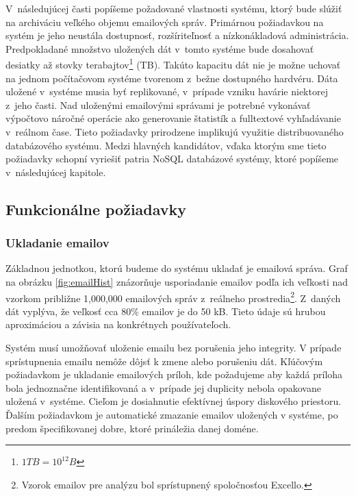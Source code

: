 \documentclass[11pt,twoside,a4paper]{book}
\begin{document}
V~následujúcej časti popíšeme požadované vlastnosti systému, ktorý bude slúžiť na archiváciu veľkého objemu emailových správ. Primárnou požiadavkou na systém je jeho neustála dostupnosť, rozšíriteľnosť a nízkonákladová administrácia. Predpokladané množstvo uložených dát v~tomto systéme bude dosahovať desiatky až stovky terabajtov\footnote{$1 TB = 10^{12} B$} (TB). Takúto kapacitu dát nie je možne uchovať na jednom počítačovom systéme tvorenom z~bežne dostupného hardvéru. Dáta uložené v~systéme musia byť replikované, v~prípade vzniku havárie niektorej z~jeho časti. Nad uloženými emailovými správami je potrebné vykonávať výpočtovo náročné operácie ako generovanie štatistík a fulltextové vyhľadávanie v~reálnom čase. Tieto požiadavky prirodzene implikujú využitie distribuovaného databázového systému. Medzi hlavných kandidátov, vďaka ktorým sme tieto požiadavky schopní vyriešiť patria NoSQL databázové systémy, ktoré popíšeme v~následujúcej kapitole.


\subsection{Funkcionálne požiadavky}

\subsubsection*{Ukladanie emailov}
Základnou jednotkou, ktorú budeme do systému ukladať je emailová správa. Graf na obrázku \ref{fig:emailHist} znázorňuje usporiadanie emailov podľa ich veľkosti nad vzorkom približne 1,000,000 emailových správ z~reálneho prostredia\footnote{Vzorok emailov pre analýzu bol sprístupnený spoločnosťou Excello.}. Z~daných dát vyplýva, že veľkosť cca 80\% emailov je do 50 kB. Tieto údaje sú hrubou aproximáciou a závisia na konkrétnych používateľoch.

Systém musí umožňovať uloženie emailu bez porušenia jeho integrity. V prípade sprístupnenia emailu nemôže dôjsť k zmene alebo porušeniu dát. Kľúčovým požiadavkom je ukladanie emailových príloh, kde požadujeme aby každá príloha bola jednoznačne identifikovaná a v~prípade jej duplicity nebola opakovane uložená v~systéme. Cieľom je dosiahnutie efektívnej úspory diskového priestoru. Ďalším požiadavkom je automatické zmazanie emailov uložených v systéme, po predom špecifikovanej dobre, ktoré prináležia danej doméne.
\end{document}
